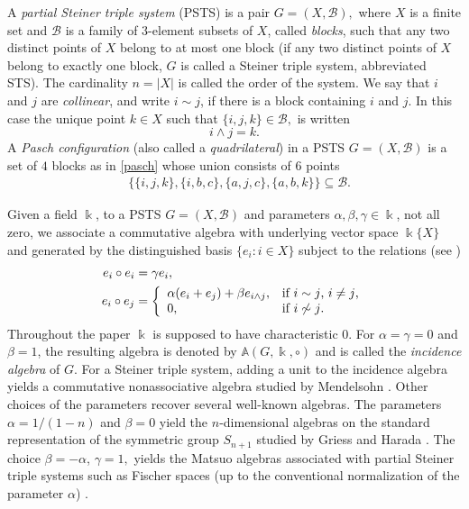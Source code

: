\documentclass[times,11pt,reqno]{amsproc}
\theoremstyle{definition}
\numberwithin{equation}{section}
\newcommand\fie{\Bbbk}
\def\alg{\mathbb{A}}
\begin{document}
A \emph{partial Steiner triple system} (PSTS) is a pair
$G=(X,\mathcal B),$ where $X$ is a finite set and $\mathcal B$ is a family of $3$-element
subsets of $X$, called \emph{blocks}, such that any two distinct points of
$X$ belong to at most one block (if any two distinct points of $X$ belong to exactly one block, $G$ is called a Steiner triple system, abbreviated STS). The cardinality $n=|X|$ is called the order of the system.
We say that $i$ and $j$ are \emph{collinear}, and write $ i\sim j$, if there is a block containing $i$ and $j$. In this case the unique point $k\in X$ such that $ \{i,j,k\}\in\mathcal B,$ is written $$ i\wedge j=k. $$
A \emph{Pasch configuration} (also called a \emph{quadrilateral}) in a PSTS $G=(X,\mathcal B)$ is a set of $4$ blocks as in \eqref{pasch} whose union consists of $6$ points
\begin{align}\label{pasch}
&\{\{i, j, k\}, \{i, b, c\},\{a, j, c\},\{a, b, k\}\}\subseteq\mathcal B.
\end{align}


Given a field $\fie$, to a PSTS $G = (X, \mathcal B)$ and parameters $\alpha,\beta,\gamma\in\fie$, not all zero, we associate a commutative algebra with underlying vector space $\fie\{X\}$ and generated by the distinguished basis $\{e_{i}: i \in X\}$ subject to the relations (see \cite[Lemma $2.1$]{Fox2022})
\begin{equation}\label{eq:algebraSdef}
\begin{aligned}
e_i\circ e_i&=\gamma e_i,\\
e_i\circ e_j&=
\left\{
  \begin{array}{ll}
    \alpha(e_i+e_j)+\beta e_{i\wedge j},
    & \hbox{if $i\sim j$, $i\neq j$,}\\
    0,
    & \hbox{if $i\not\sim j$.}
  \end{array}
\right.
\end{aligned}
\end{equation}
Throughout the paper $\fie$ is supposed to have characteristic $0$.
For $\alpha=\gamma=0$ and $\beta=1$, the resulting algebra is denoted by $\alg(G,\fie,\circ)$ and is called the \emph{incidence algebra} of $G$. For a Steiner triple system, adding a unit to the incidence algebra yields a commutative nonassociative algebra studied by Mendelsohn \cite{Mendelsohn}. Other choices of the parameters recover several well-known algebras. The parameters $\alpha = 1/(1-n)$ and $\beta = 0$ yield the $n$-dimensional algebras on the standard representation of the symmetric group $S_{n+1}$ studied by Griess \cite{Dong-Griess} and Harada \cite{Harada}. The choice $ \beta=-\alpha$, $\gamma=1,$ yields the Matsuo algebras associated with partial Steiner triple systems such as Fischer spaces (up to the conventional normalization of the parameter $\alpha$) \cite{DeMedts-Rehren, Hall-Rehren-Shpectorov,Matsuo-3transposition}.
\end{document}
